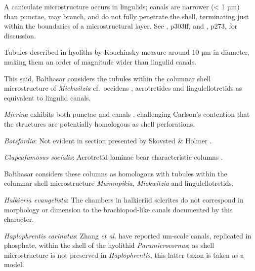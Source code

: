 \documentclass[openany]{book}
\theoremstyle{definition}
\theoremstyle{definition}
\theoremstyle{definition}
\theoremstyle{remark}
\begin{document}
A caniculate microstructure occurs in lingulids; canals are narrower
(\textless{} 1 µm) than punctae, may branch, and do not fully penetrate
the shell, terminating just within the boundaries of a microstructural
layer. See \citet{Williams1997Introduction}, p303ff, and
\citet{Balthasar2008iMummpikia}, p273, for discussion.

Tubules described in hyoliths by Kouchinsky
\citeyearpar{Kouchinsky2000Skeletalmicrostructures} measure around 10 µm
in diameter, making them an order of magnitude wider than lingulid
canals.

This said, Balthasar \citeyearpar{Balthasar2008iMummpikia} considers the
tubules within the columnar shell microstructure of \emph{Mickwitzia}
cf.~occidens \citep[1--3 µm wide,][]{Skovsted2003EarlyCambrian},
acrotretides \citep[1 µm wide,
see][\citet{Zhang2016Epithelialcell}]{Holmer1989MiddleOrdovician} and
lingulellotretids \citep[100 nm wide,][]{Cusack1999Chemicostructural} as
equivalent to lingulid canals.

\emph{Micrina} exhibits both punctae and canals
\citep{Harper2017Brachiopodsorigin}, challenging Carlson's contention
\citep[in][]{Williams2007Supplement} that the structures are potentially
homologous as shell perforations.

\hypertarget{Botsfordia-coding-116}{}
\emph{Botsfordia}: Not evident in section presented by Skovsted \&
Holmer \citeyearpar{Skovsted2003EarlyCambrian}.

\hypertarget{Clupeafumosus_socialis-coding-116}{}
\emph{Clupeafumosus socialis}: Acrotretid laminae bear characteristic
columns \citep[e.g.][]{Zhang2016Epithelialcell}.

Balthasar \citeyearpar{Balthasar2008iMummpikia} considers these columns
as homologous with tubules within the columnar shell microstructure
\emph{Mummpikia}, \emph{Mickwitzia} and lingulellotretids.

\hypertarget{Halkieria_evangelista-coding-116}{}
\emph{Halkieria evangelista}: The chambers in halkieriid sclerites do
not correspond in morphology or dimension to the brachiopod-like canals
documented by this character.

\hypertarget{Haplophrentis_carinatus-coding-116}{}
\emph{Haplophrentis carinatus}: Zhang \emph{et al}.
\citeyearpar{Zhang2018Ahyolithid} have reported um-scale canals,
replicated in phosphate, within the shell of the hyolithid
\emph{Paramicrocornus}; as shell microstructure is not preserved in
\emph{Haplophrentis}, this latter taxon is taken as a model.
\end{document}
